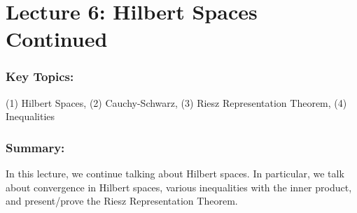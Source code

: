 \documentclass{article}
\begin{document}
\section{Lecture 6: Hilbert Spaces Continued}
\subsubsection{Key Topics:}
(1) Hilbert Spaces, (2) Cauchy-Schwarz, (3) Riesz Representation Theorem, (4) Inequalities
\subsubsection{Summary:}
In this lecture, we continue talking about Hilbert spaces. In particular, we talk about convergence in Hilbert spaces, various inequalities with the inner product, and present/prove the Riesz Representation Theorem. 
\end{document}
